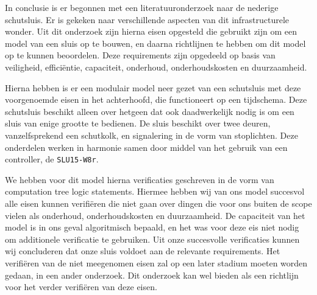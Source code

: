 \documentclass[../verslag.tex]{subfiles}
\begin{document}
In conclusie is er begonnen met een literatuuronderzoek naar de nederige schutsluis. Er is gekeken naar verschillende aspecten van dit infrastructurele wonder. Uit dit onderzoek zijn hierna eisen opgesteld die gebruikt zijn om een model van een sluis op te bouwen, en daarna richtlijnen te hebben om dit model op te kunnen beoordelen. Deze requirements zijn opgedeeld op basis van veiligheid, efficiëntie, capaciteit, onderhoud, onderhoudskosten en duurzaamheid. 

Hierna hebben is er een modulair model neer gezet van een schutsluis met deze voorgenoemde eisen in het achterhoofd, die functioneert op een tijdschema. Deze schutsluis beschikt alleen over hetgeen dat ook daadwerkelijk nodig is om een sluis van enige grootte te bedienen. De sluis beschikt over twee deuren, vanzelfsprekend een schutkolk, en signalering in de vorm van stoplichten. Deze onderdelen werken in harmonie samen door middel van het gebruik van een controller, de \verb|SLU15-W8r|.

We hebben voor dit model hierna verificaties geschreven in de vorm van computation tree logic statements. Hiermee hebben wij van ons model succesvol alle eisen kunnen verifiëren die niet gaan over dingen die voor ons buiten de scope vielen als onderhoud, onderhoudskosten en duurzaamheid. De capaciteit van het model is in ons geval algoritmisch bepaald, en het was voor deze eis niet nodig om additionele verificatie te gebruiken. Uit onze succesvolle verificaties kunnen wij concluderen dat onze sluis voldoet aan de relevante requirements. Het verifiëren van de niet meegenomen eisen zal op een later stadium moeten worden gedaan, in een ander onderzoek. Dit onderzoek kan wel bieden als een richtlijn voor het verder verifiëren van deze eisen.
\end{document}
